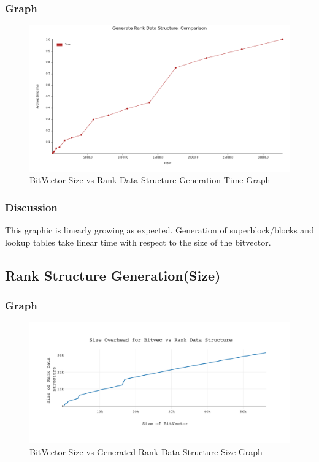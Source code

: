 \documentclass{report}
\begin{document}
\subsubsection*{Graph}

\begin{figure}[h!]
    \centering
    \includegraphics[scale=0.5]{generate_rank_time.png}
    \caption{BitVector Size vs Rank Data Structure Generation Time Graph}
    \label{fig:my_label}
\end{figure}

\subsubsection*{Discussion}
This graphic is linearly growing as expected. Generation of superblock/blocks and lookup tables take linear time with respect to the size of the bitvector.

\newpage

\subsection*{Rank Structure Generation(Size)}

\subsubsection*{Graph}

\begin{figure}[h!]
    \centering
    \includegraphics[scale=0.15]{diagram-20220306.png}
    \caption{BitVector Size vs Generated Rank Data Structure Size Graph}
    \label{fig:my_label}
\end{figure}
\end{document}
